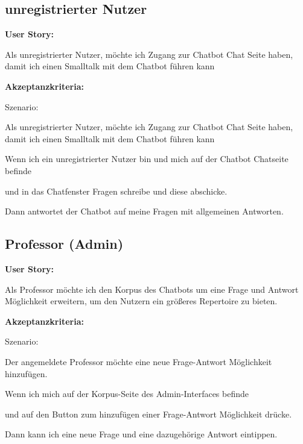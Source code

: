 \newpage
\subsection{unregistrierter Nutzer}

\textbf{User Story:}
\newline

\noindent Als unregistrierter Nutzer,
möchte ich Zugang zur Chatbot Chat Seite haben,
damit ich einen Smalltalk mit dem Chatbot führen kann
\newline

\noindent \textbf{Akzeptanzkriteria:}
\newline

\noindent Szenario: 

\noindent Als unregistrierter Nutzer,
möchte ich Zugang zur Chatbot Chat Seite haben,
damit ich einen Smalltalk mit dem Chatbot führen kann
\newline

\noindent Wenn ich ein unregistrierter Nutzer bin und mich auf der Chatbot Chatseite befinde

\noindent und in das Chatfenster Fragen schreibe und diese abschicke.

\noindent Dann antwortet der Chatbot auf meine Fragen mit allgemeinen Antworten.

\subsection{Professor (Admin)}

\textbf{User Story:}
\newline

\noindent Als Professor möchte ich den Korpus des Chatbots 
um eine Frage und Antwort Möglichkeit erweitern, 
um den Nutzern ein größeres Repertoire zu bieten.
\newline

\noindent \textbf{Akzeptanzkriteria:}
\newline

\noindent Szenario: 

\noindent Der angemeldete Professor möchte eine neue Frage-Antwort Möglichkeit hinzufügen.
\newline

\noindent Wenn ich mich auf der Korpus-Seite des Admin-Interfaces befinde

\noindent und auf den Button zum hinzufügen einer Frage-Antwort Möglichkeit drücke.

\noindent Dann kann ich eine neue Frage und eine dazugehörige Antwort eintippen.




